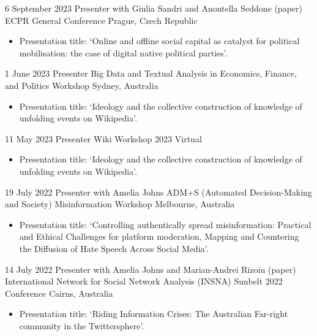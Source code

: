 \documentclass[11pt,a4paper,sans]{moderncv}
\begin{document}
\cventry 
{6 September 2023}
{Presenter with Giulia Sandri and Anontella Seddone (paper)}
{ECPR General Conference}
{Prague, Czech Republic}
{}
      {
      \begin{itemize} %
        \item {Presentation title: `Online and offline social capital as catalyst for political mobilisation: the case of digital native political parties'.}
      \end{itemize}
    }

\cventry 
{1 June 2023}
{Presenter}
{Big Data and Textual Analysis in Economics, Finance, and Politics Workshop}
{Sydney, Australia}
{}
      {
      \begin{itemize} %
        \item {Presentation title: `Ideology and the collective construction of knowledge of unfolding events on Wikipedia'.}
      \end{itemize}
    }

\cventry 
{11 May 2023}
{Presenter}
{Wiki Workshop 2023}
{Virtual}
{}
      {
      \begin{itemize} %
        \item {Presentation title: `Ideology and the collective construction of knowledge of unfolding events on Wikipedia'.}
      \end{itemize}
    }
 
\cventry %
{19 July 2022}
{Presenter with Amelia Johns}
{ADM+S (Automated Decision-Making and Society) Misinformation Workshop}
{Melbourne, Australia}
{}
      {
      \begin{itemize} %
        \item {Presentation title: `Controlling authentically spread misinformation: Practical and Ethical
Challenges for platform moderation, Mapping and Countering the Diffusion of Hate Speech Across Social Media'.}
      \end{itemize}
    }

\cventry %
{14 July 2022}
{Presenter with Amelia Johns and Marian-Andrei Rizoiu (paper)}
{International Network for Social Network Analysis (INSNA) Sunbelt 2022 Conference}
{Cairns, Australia}
{}
       {
      \begin{itemize} %
        \item {Presentation title: `Riding Information Crises: The
            Australian Far-right community in the Twittersphere'.}
      \end{itemize}
    }
\end{document}
